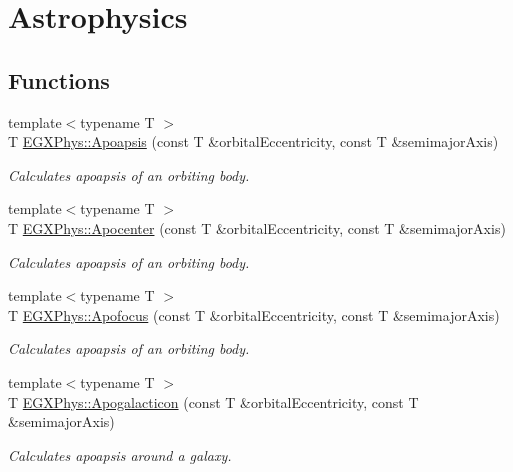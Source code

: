 \hypertarget{group___astrophysics}{}\section{Astrophysics}
\label{group___astrophysics}
\subsection*{Functions}
\begin{DoxyCompactItemize}
\item 
{\footnotesize template$<$typename T $>$ }\\T \hyperlink{group___astrophysics_gaf962e650bf84a568458e8eb39b1c61ba}{E\+G\+X\+Phys\+::\+Apoapsis} (const T \&orbital\+Eccentricity, const T \&semimajor\+Axis)
\begin{DoxyCompactList}\small\item\em Calculates apoapsis of an orbiting body. \end{DoxyCompactList}\item 
{\footnotesize template$<$typename T $>$ }\\T \hyperlink{group___astrophysics_ga5e51a53e2f974264bada34f159fdc948}{E\+G\+X\+Phys\+::\+Apocenter} (const T \&orbital\+Eccentricity, const T \&semimajor\+Axis)
\begin{DoxyCompactList}\small\item\em Calculates apoapsis of an orbiting body. \end{DoxyCompactList}\item 
{\footnotesize template$<$typename T $>$ }\\T \hyperlink{group___astrophysics_gaa53ac4e15bc6bc0fecf72eadb7a513e0}{E\+G\+X\+Phys\+::\+Apofocus} (const T \&orbital\+Eccentricity, const T \&semimajor\+Axis)
\begin{DoxyCompactList}\small\item\em Calculates apoapsis of an orbiting body. \end{DoxyCompactList}\item 
{\footnotesize template$<$typename T $>$ }\\T \hyperlink{group___astrophysics_ga09b4c7d5e971dc28e1ba37f479958c27}{E\+G\+X\+Phys\+::\+Apogalacticon} (const T \&orbital\+Eccentricity, const T \&semimajor\+Axis)
\begin{DoxyCompactList}\small\item\em Calculates apoapsis around a galaxy. \end{DoxyCompactList}\item 

\end{DoxyCompactItemize}
